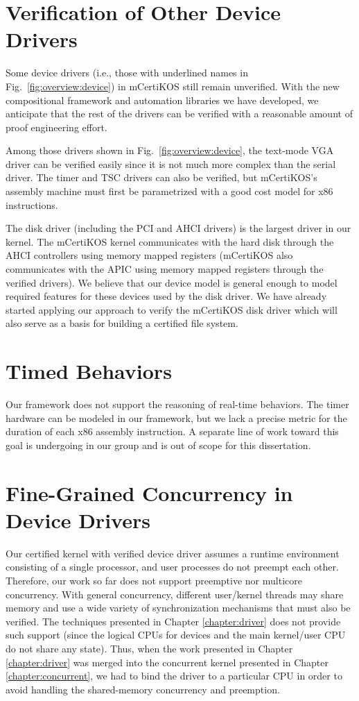 \section{Verification of Other Device Drivers}
Some device drivers (i.e., those with underlined names in
Fig.~\ref{fig:overview:device}) in mCertiKOS still remain unverified.
With the new compositional framework and automation libraries we have
developed, we anticipate that the rest of the drivers can be verified
with a reasonable amount of proof engineering effort.

Among those drivers shown in Fig.~\ref{fig:overview:device}, the
text-mode VGA driver can be verified easily since it is
not much more complex than the serial driver. The timer and TSC drivers
can also be verified, but mCertiKOS's assembly machine must first be
parametrized with a good cost model for x86 instructions.

The disk driver (including the PCI and AHCI drivers) is the largest
driver in our kernel. The mCertiKOS kernel communicates with the hard
disk through the AHCI controllers using memory mapped registers
(mCertiKOS also communicates with the APIC using memory mapped
registers through the verified drivers). We believe that our device
model is general enough to model required features for these devices
used by the disk driver. We have already started applying our approach
to verify the mCertiKOS disk driver which will also serve as a basis
for building a certified file system.

\section{Timed Behaviors}

Our framework does not support the reasoning of real-time behaviors.
The timer hardware can be modeled in our framework, but we lack a precise
metric for the duration of each x86 assembly instruction.
A separate line of work toward this goal is undergoing in our group and is out of scope
for this dissertation.

\section{Fine-Grained Concurrency in Device Drivers}
Our certified kernel with verified device driver assumes a runtime environment consisting
of a single processor, and user processes do not preempt each other.
Therefore, our work so far does not support preemptive nor multicore
concurrency.  With general concurrency, different user/kernel threads
may share memory and use a wide variety of synchronization
mechanisms that must also be verified.  The techniques presented in
Chapter \ref{chapter:driver} does not provide such support (since the logical CPUs for
devices and the main kernel/user CPU do not share any state). 
Thus, when the work presented in Chapter \ref{chapter:driver} was merged
into the concurrent kernel presented in Chapter \ref{chapter:concurrent},
we had to bind the driver to a particular CPU in order to avoid handling
the shared-memory concurrency and preemption.

